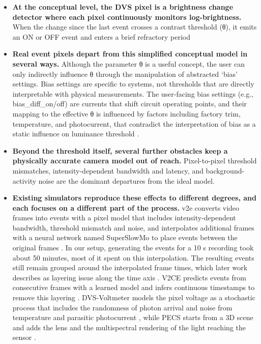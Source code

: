 \begin{itemize}
  \item \textbf{At the conceptual level, the DVS pixel is a brightness change detector where each pixel continuously monitors log-brightness.} When the change since the last event crosses a contrast threshold (θ), it emits an ON or OFF event and enters a brief refractory period \cite{lichtsteiner2008dvs,gallego2022event} 
  
  \item \textbf{Real event pixels depart from this simplified conceptual model in several ways.} Although the parameter θ is a useful concept, the user can only indirectly influence θ through the manipulation of abstracted `bias' settings.  Bias settings are specific to systems, not thresholds that are directly interpretable with physical measurements. The user-facing bias settings (e.g., bias\_diff\_on/off) are currents that shift circuit operating points, and their mapping to the effective θ is influenced by factors including factory trim, temperature, and photocurrent, that contradict the interpretation of bias as a static influence on luminance threshold \cite{graca2023biasing}.
  
  \item \textbf{Beyond the threshold itself, several further obstacles keep a physically accurate camera model out of reach.} Pixel-to-pixel threshold mismatches, intensity-dependent bandwidth and latency, and background-activity noise are the dominant departures from the ideal model. \cite{hu2021v2e,graca2021noise}

  \item \textbf{Existing simulators reproduce these effects to different degrees, and each focuses on a different part of the process.} v2e converts video frames into events with a pixel model that includes intensity-dependent bandwidth, threshold mismatch and noise, and interpolates additional frames with a neural network named SuperSlowMo to place events between the original frames \cite{hu2021v2e}. In our setup, generating the events for a 10 s recording took about 50 minutes, most of it spent on this interpolation. The resulting events still remain grouped around the interpolated frame times, which later work describes as layering issue along the time axis \cite{zhang2024v2ce,han2024pecs}. V2CE predicts events from consecutive frames with a learned model and infers continuous timestamps to remove this layering \cite{zhang2024v2ce}. DVS-Voltmeter models the pixel voltage as a stochastic process that includes the randomness of photon arrival and noise from temperature and parasitic photocurrent \cite{lin2022dvsvoltmeter}, while PECS starts from a 3D scene and adds the lens and the multispectral rendering of the light reaching the sensor \cite{han2024pecs}.
  

\end{itemize}
